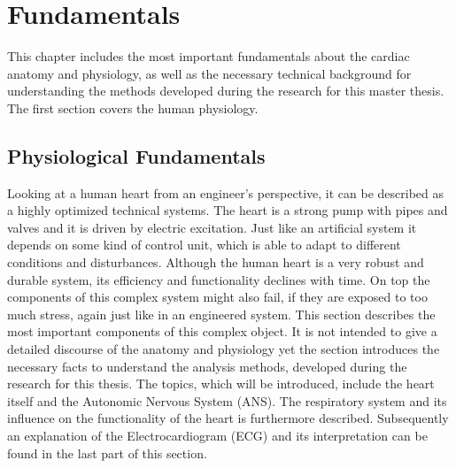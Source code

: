 
\chapter{Fundamentals}
\label{fundamentals}
\thispagestyle{empty}



This chapter includes the most important fundamentals about the cardiac anatomy and physiology, as well as the necessary technical background for understanding the methods developed during the research for this master thesis. The first section covers the human physiology.






\section{Physiological Fundamentals}
\label{physiologicalFundamentals}
Looking at a human heart from an engineer's perspective, it can be described as a highly optimized technical systems. The heart is a strong pump with pipes and valves and it is driven by electric excitation. Just like an artificial system it depends on some kind of control unit, which is able to adapt to different conditions and disturbances. Although the human heart is a very robust and durable system, its efficiency and functionality declines with time. On top the components of this complex system might also fail, if they are exposed to too much stress, again just like in an engineered system. 
\newline
This section describes the most important components of this complex object. It is not intended to give a detailed discourse of the anatomy and physiology yet the section introduces the necessary facts to understand the analysis methods, developed during the research for this thesis. The topics, which will be introduced, include the heart itself and the Autonomic Nervous System (ANS). The respiratory system and its influence on the functionality of the heart is furthermore described. Subsequently an explanation of the Electrocardiogram (ECG) and its interpretation can be found in the last part of this section.

